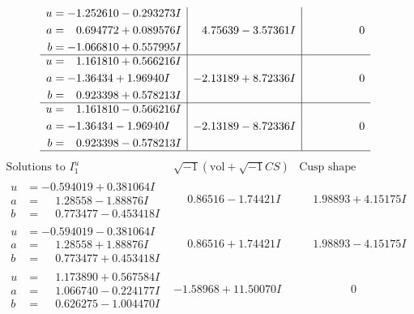 \documentclass[1p]{elsarticle_modified}
\theoremstyle{definition}
\newcommand{\I}{\sqrt{-1}}
\begin{document}
$$\begin{array}{c|c|c}
\begin{aligned}
u &= -1.252610 - 0.293273 I \\
a &= \phantom{-}0.694772 + 0.089576 I \\
b &= -1.066810 + 0.557995 I\end{aligned}
 & \phantom{-}4.75639 - 3.57361 I & \phantom{-0.000000 } 0 \\ \hline\begin{aligned}
u &= \phantom{-}1.161810 + 0.566216 I \\
a &= -1.36434 + 1.96940 I \\
b &= \phantom{-}0.923398 + 0.578213 I\end{aligned}
 & -2.13189 + 8.72336 I & \phantom{-0.000000 } 0 \\ \hline\begin{aligned}
u &= \phantom{-}1.161810 - 0.566216 I \\
a &= -1.36434 - 1.96940 I \\
b &= \phantom{-}0.923398 - 0.578213 I\end{aligned}
 & -2.13189 - 8.72336 I & \phantom{-0.000000 } 0\\
 \hline 
 \end{array}$$\newpage$$\begin{array}{c|c|c}  
\text{Solutions to }I^u_{1}& \I (\text{vol} + \sqrt{-1}CS) & \text{Cusp shape}\\
 \hline 
\begin{aligned}
u &= -0.594019 + 0.381064 I \\
a &= \phantom{-}1.28558 - 1.88876 I \\
b &= \phantom{-}0.773477 - 0.453418 I\end{aligned}
 & \phantom{-}0.86516 - 1.74421 I & \phantom{-}1.98893 + 4.15175 I \\ \hline\begin{aligned}
u &= -0.594019 - 0.381064 I \\
a &= \phantom{-}1.28558 + 1.88876 I \\
b &= \phantom{-}0.773477 + 0.453418 I\end{aligned}
 & \phantom{-}0.86516 + 1.74421 I & \phantom{-}1.98893 - 4.15175 I \\ \hline\begin{aligned}
u &= \phantom{-}1.173890 + 0.567584 I \\
a &= \phantom{-}1.066740 - 0.224177 I \\
b &= \phantom{-}0.626275 - 1.004470 I\end{aligned}
 & -1.58968 + 11.50070 I & \phantom{-0.000000 } 0 \\ \hline\begin{aligned}

\end{aligned}
\end{array}$$
\end{document}
